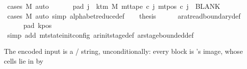 \begin{isabellebody}
\ {\isacharparenleft}{\kern0pt}cases\ M{\isacharparenright}{\kern0pt}\ auto\isanewline
\ \ %
\isanewline
\ \ \isamarkupfalse%
\ pad{\isacharcolon}{\kern0pt}\ {\isachardoublequoteopen}{\isasymforall}j\ {\isasymge}\ k{\isacharunderscore}{\kern0pt}tm\ M{\isachardot}{\kern0pt}\ mt{\isacharunderscore}{\kern0pt}tape\ {\isacharquery}{\kern0pt}c{\isacharprime}{\kern0pt}\ j\ {\isacharparenleft}{\kern0pt}mt{\isacharunderscore}{\kern0pt}pos\ {\isacharquery}{\kern0pt}c{\isacharprime}{\kern0pt}\ j{\isacharparenright}{\kern0pt}\ {\isacharequal}{\kern0pt}\ BLANK{}{\isachardoublequoteclose}\isanewline
\ \ \ \ \isamarkupfalse%
\ {\isacharparenleft}{\kern0pt}cases\ M{\isacharparenright}{\kern0pt}\ {\isacharparenleft}{\kern0pt}auto\ simp{\isacharcolon}{\kern0pt}\ alphabet{\isacharunderscore}{\kern0pt}reduce{\isacharunderscore}{\kern0pt}def{\isacharparenright}{\kern0pt}\isanewline
\ \ \isamarkupfalse%
\ {\isacharquery}{\kern0pt}thesis\isanewline
\ \ \ \ \isamarkupfalse%
\ ar{\isacharunderscore}{\kern0pt}at{\isacharunderscore}{\kern0pt}read{\isacharunderscore}{\kern0pt}boundary{\isacharunderscore}{\kern0pt}def\isanewline
\ \ \ \ \isamarkupfalse%
\ pad\ kpos\isanewline
\ \ \ \ \isamarkupfalse%
\ {\isacharparenleft}{\kern0pt}simp\ add{\isacharcolon}{\kern0pt}\ mt{\isacharunderscore}{\kern0pt}state{\isacharunderscore}{\kern0pt}init{\isacharunderscore}{\kern0pt}config\ ar{\isacharunderscore}{\kern0pt}init{\isacharunderscore}{\kern0pt}stage{\isacharunderscore}{\kern0pt}def\ ar{\isacharunderscore}{\kern0pt}stage{\isacharunderscore}{\kern0pt}bounded{\isacharunderscore}{\kern0pt}def{\isacharparenright}{\kern0pt}\isanewline
{}\isamarkupfalse%
%
\endisatagproof
{\isafoldproof}%
%
\isadelimproof
%
\endisadelimproof
%
\begin{isamarkuptext}%
The encoded input is a / string,
  unconditionally: every block is 's image,
  whose cells lie in  by

\end{isamarkuptext}
\end{isabellebody}
